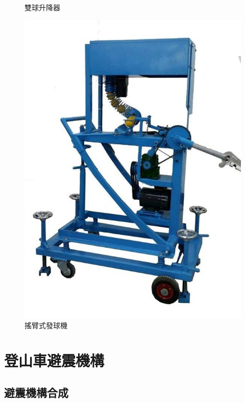 \documentclass[14pt,a4paper]{report}  %
\newcommand{\fourteen}{\fontsize{14pt}{\baselineskip}\selectfont}%
\begin{document}
{\begin{figure}[H]
        \caption{雙球升降器} %
        \label{fig:scale} %
    \end{figure}
    \begin{figure}[H]
        \centering
        \includegraphics[scale=0.6]{搖臂式發球機.jpg} 
        \caption{搖臂式發球機} %
        \label{fig:scale} %
    \end{figure}
        \chapter{登山車避震機構}
      \section{避震機構合成}
      \fourteen {機構合成設計需求為騎乘姿勢改變時或遇到顛頗不整的路時仍能保持整體的平衡，即Anti-squat及Anti-rise的數值能在100\%附近，而上述合成需求之適應函數可表示為}
      \hspace*{\fill} \\
      
}
\end{document}
